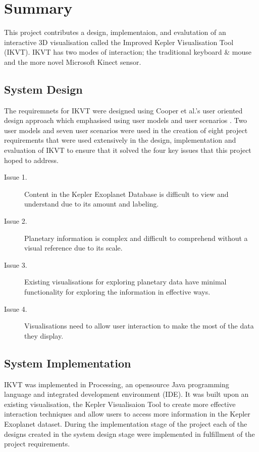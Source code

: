 \chapter{Summary}\label{C:con}
This project contributes a design, implementaion, and evalutation of an
interactive 3D visualisation called the Improved Kepler Visualisation Tool
(IKVT). IKVT has two modes of interaction; the traditional keyboard \& mouse and
the more novel Microsoft Kinect sensor. 

\section{System Design}
The requiremnets for IKVT were designed using Cooper et al.'s user oriented
design approach which emphasised using user models and user scenarios \cite{AboutFace3}.  Two user
models and seven user scenarios were used in the creation of eight project requirements that
were used extensively in the design, implementation and evaluation of IKVT to ensure that it
solved the four key issues that this project hoped to address.
\begin{description}
 \item[Issue 1.] Content in the Kepler Exoplanet Database is difficult to view
and
understand due to its amount and labeling.
 \item[Issue 2.] Planetary information is complex and difficult to comprehend
without
a visual reference due to its scale.
 \item[Issue 3.] Existing visualisations for exploring planetary data have
minimal
functionality for exploring the information in effective ways.
 \item[Issue 4.] Visualisations need to allow user interaction to make the most
of
the data they display.
\end{description}

\section{System Implementation}
IKVT was implemented in Processing, an opensource Java programming language and
integrated development environment (IDE). It was built upon an existing
visualisation, the Kepler Visualisaion Tool \cite{kepler_github,
kepler_article} to create more effective interaction techniques and allow users to access more information in the Kepler Exoplanet dataset. During the implementation stage of the project each of the
designs created in the system design stage were implemented in
fulfillment of the project requirements. 

